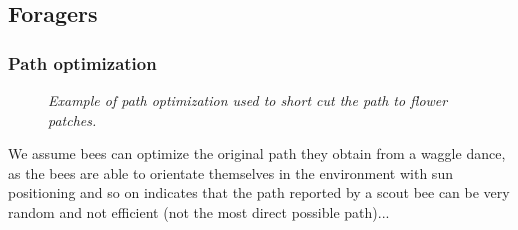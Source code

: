 \subsection{Foragers}
	\subsubsection{Path optimization}
		\label{chap:pathOptimization}
		\begin{figure}
			\centering
			\caption{\textit{Example of path optimization used to short cut the path to flower patches.}}
			\label{fig:pathOptimization}
		\end{figure}
		
		We assume bees can optimize the original path they obtain from a waggle dance, as the bees are able to orientate themselves in the environment with sun positioning and so on
		indicates that the path reported by a scout bee can be very random and not efficient (not the most direct possible path)...